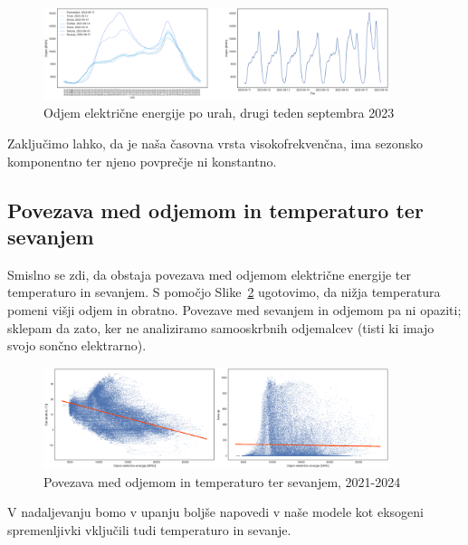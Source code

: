 \documentclass[a4paper, 11pt]{article}
\begin{document}
\begin{figure}[h!]
    \centering
    \caption{Odjem električne energije po urah, drugi teden septembra 2023}\par\medskip
    \label{fig:odjem_teden}
    \includegraphics[width=0.9\textwidth]{odjem_teden.png}
\end{figure}

\noindent Zaključimo lahko, da je naša časovna vrsta visokofrekvenčna, ima sezonsko komponentno ter njeno povprečje ni konstantno.


\subsection{Povezava med odjemom in temperaturo ter sevanjem}

\noindent Smislno se zdi, da obstaja povezava med odjemom električne energije ter
temperaturo in sevanjem. S pomočjo Slike~\ref{fig:temp_sevanje} ugotovimo, da
nižja temperatura pomeni višji odjem in obratno. 
Povezave med sevanjem in odjemom pa ni opaziti; sklepam da zato, ker 
ne analiziramo samooskrbnih odjemalcev (tisti ki imajo svojo sončno elektrarno). 

\begin{figure}[h!]
    \centering
    \caption{Povezava med odjemom in temperaturo ter sevanjem, 2021-2024}\par\medskip
    \label{fig:temp_sevanje}
    \includegraphics[width=0.9\textwidth]{temp_sevanje.png}
\end{figure}

\noindent V nadaljevanju bomo v upanju boljše napovedi v naše modele kot 
eksogeni spremenljivki vključili tudi temperaturo in sevanje. 
\end{document}
